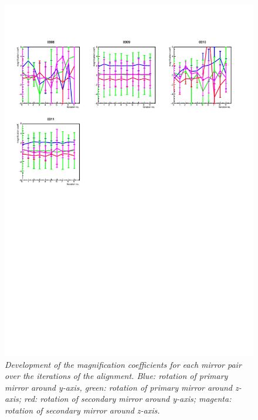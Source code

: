 \begin{figure}[!ht]
	\vspace*{-0.cm}
	\begin{center}
		\includegraphics[width=1.\textwidth]{rich1_mag2_1.pdf}
		\vspace*{-1.5cm}
	\end{center}
	\caption{\textit{Development of the magnification coefficients for each mirror pair over the iterations of the alignment. Blue: rotation of primary mirror around y-axis, green: rotation of primary mirror around z-axis; red: rotation of secondary mirror around y-axis; magenta: rotation of secondary mirror around z-axis.}}
	\label{fig:rich12d_1}
\end{figure}

\clearpage
